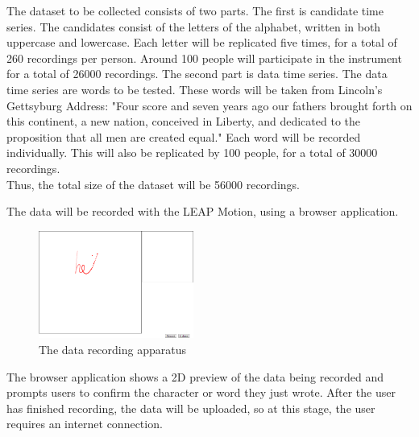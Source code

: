 The dataset to be collected consists of two parts.
The first is candidate time series. The candidates consist of the letters of the alphabet, written in both uppercase and lowercase. Each letter will be replicated five times, for a total of 260 recordings per person. Around 100 people will participate in the instrument for a total of 26000 recordings.
The second part is data time series. The data time series are words to be tested. These words will be taken from Lincoln's Gettsyburg Address: "Four score and seven years ago our fathers brought forth on this continent, a new nation, conceived in Liberty, and dedicated to the proposition that all men are created equal." Each word will be recorded individually. This will also be replicated by 100 people, for a total of 30000 recordings.
\\[1\baselineskip]
Thus, the total size of the dataset will be 56000 recordings.

The data will be recorded with the LEAP Motion, using a browser application. 

\begin{figure}
  \begin{center}
  \includegraphics[width=2in]{images/recording-1-cropped.PNG}
  \caption{The data recording apparatus}
  \label{fig:teaser}
  \end{center}  
\end{figure}

The browser application shows a 2D preview of the data being recorded and prompts users to confirm the character or word they just wrote.
After the user has finished recording, the data will be uploaded, so at this stage, the user requires an internet connection.

